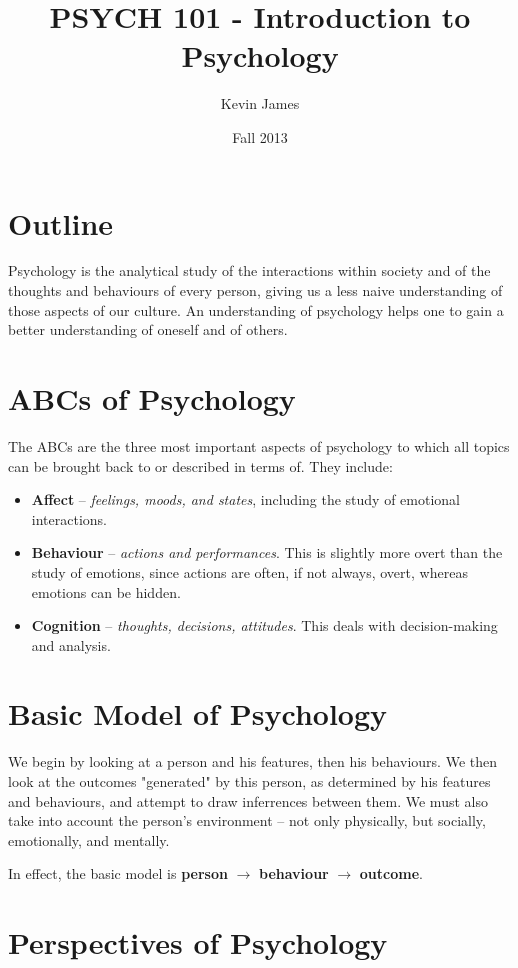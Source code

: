 \documentclass[12pt]{article}
\begin{document}
\title{PSYCH 101 - Introduction to Psychology}
\author{Kevin James}
\date{\vspace{-2ex}Fall 2013}
\maketitle\HRule

\section*{Outline}
Psychology is the analytical study of the interactions within society and of the thoughts and behaviours of every person, giving us a less naive understanding of those aspects of our culture. An understanding of psychology helps one to gain a better understanding of oneself and of others.

\section*{ABCs of Psychology}
The ABCs are the three most important aspects of psychology to which all topics can be brought back to or described in terms of. They include:
\begin{itemize}
\item {\bf Affect} -- {\it feelings, moods, and states}, including the study of emotional interactions.
\item {\bf Behaviour} -- {\it actions and performances}. This is slightly more overt than the study of emotions, since actions are often, if not always, overt, whereas emotions can be hidden.
\item {\bf Cognition} -- {\it thoughts, decisions, attitudes}. This deals with decision-making and analysis.
\end{itemize}

\section*{Basic Model of Psychology}
We begin by looking at a person and his features, then his behaviours. We then look at the outcomes "generated" by this person, as determined by his features and behaviours, and attempt to draw inferrences between them. We must also take into account the person's environment -- not only physically, but socially, emotionally, and mentally.

In effect, the basic model is {\bf person} $\rightarrow$ {\bf behaviour} $\rightarrow$ {\bf outcome}.

\section*{Perspectives of Psychology}
\end{document}
